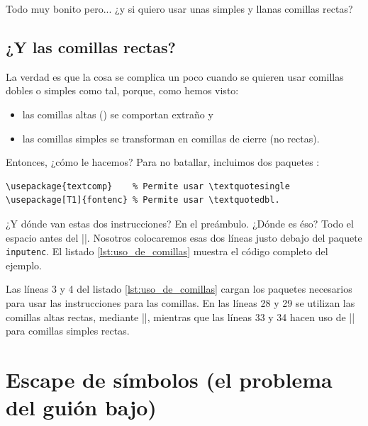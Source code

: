Todo muy bonito pero... ¿y si quiero usar unas simples y llanas comillas rectas?



\subsection{¿Y las comillas rectas?}
\label{sub:comillas_rectas}



La verdad es que la cosa se complica un poco cuando se quieren usar comillas dobles o simples como tal, porque, como hemos visto:
\begin{itemize}
  \item las comillas altas (\textquotedbl) se comportan extraño y
  \item las comillas simples se transforman en comillas de cierre (no rectas).
\end{itemize}

Entonces, ¿cómo le hacemos? Para no batallar, incluimos dos paquetes \cite{bib:quotes}:

\begin{lstlisting}[style=latex,numbers=none]
\usepackage{textcomp}    % Permite usar \textquotesingle
\usepackage[T1]{fontenc} % Permite usar \textquotedbl.
\end{lstlisting}

¿Y dónde van estas dos instrucciones? En el preámbulo. ¿Dónde es éso? Todo el espacio antes del ||. Nosotros colocaremos esas dos líneas justo debajo del paquete \texttt{inputenc}. El listado \ref{lst:uso_de_comillas} muestra el código completo del ejemplo.



Las líneas 3 y 4 del listado \ref{lst:uso_de_comillas} cargan los paquetes necesarios para usar las instrucciones para las comillas. En las líneas 28 y 29 se utilizan las comillas altas rectas, mediante |\textquotedbl|, mientras que las líneas 33 y 34 hacen uso de |\textquotesingle| para comillas simples rectas.



\section{Escape de símbolos (el problema del guión bajo)}
\label{sec:guion_bajo}



